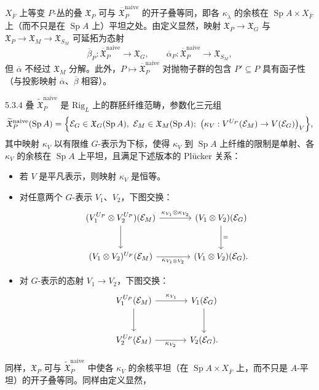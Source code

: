 $X_{\bar F}$ 上等变 $P$-丛的叠 $\mathfrak{X}_P$ 可与 $\overline{\mathfrak{X}}^{\mathrm{naive}}_P$ 的开子叠等同，即各 $\kappa_{\check\lambda}$ 的余核在 $\operatorname{Sp} A\times X_{\bar F}$ 上（而不只是在 $\operatorname{Sp} A$ 上）平坦之处。由定义显然，映射 $\mathfrak{X}_P\to\mathfrak{X}_G$ 与 $\mathfrak{X}_P\to\mathfrak{X}_M\to\mathfrak{X}_{S_M}$ 可延拓为态射
\[
\overline{\beta}_P: \overline{\mathfrak{X}}^{\mathrm{naive}}_P\longrightarrow\mathfrak{X}_G,\qquad
\overline{\alpha}_P: \overline{\mathfrak{X}}^{\mathrm{naive}}_P\longrightarrow\mathfrak{X}_{S_M},
\]
但 $\overline{\alpha}$ 不经过 $\mathfrak{X}_M$ 分解。此外，$P\mapsto\overline{\mathfrak{X}}^{\mathrm{naive}}_P$ 对抛物子群的包含 $P'\subseteq P$ 具有函子性（与投影映射 $\overline{\alpha}$、$\overline{\beta}$ 相容）。

\begin{defn}{5.3.4}
叠 $\widetilde{\mathfrak{X}}^{\mathrm{naive}}_P$ 是 $\mathrm{Rig}_L$ 上的群胚纤维范畴，参数化三元组
\[
\widetilde{\mathfrak{X}}^{\mathrm{naive}}_P(\operatorname{Sp} A)=\Bigl\{\mathcal{E}_G\in\mathfrak{X}_G(\operatorname{Sp} A),\ \mathcal{E}_M\in\mathfrak{X}_M(\operatorname{Sp} A);\ \bigl(\kappa_V: V^{U_P}(\mathcal{E}_M)\to V(\mathcal{E}_G)\bigr)_V\Bigr\},
\]
其中映射 $\kappa_V$ 以有限维 $G$-表示为下标，使得 $\kappa_V$ 到 $\operatorname{Sp} A$ 上纤维的限制是单射、各 $\kappa_V$ 的余核在 $\operatorname{Sp} A$ 上平坦，且满足下述版本的 Plücker 关系：
\begin{itemize}[leftmargin=2.2em,itemsep=0.3em]
\item 若 $V$ 是平凡表示，则映射 $\kappa_V$ 是恒等。
\item 对任意两个 $G$-表示 $V_1$、$V_2$，下图交换：
\[
\begin{tikzcd}[column sep=large,row sep=large]
(V_1^{U_P}\otimes V_2^{U_P})(\mathcal{E}_M) \arrow[r,"\kappa_{V_1}\otimes\kappa_{V_2}"] \arrow[d] & (V_1\otimes V_2)(\mathcal{E}_G) \arrow[d,"="]\\
(V_1\otimes V_2)^{U_P}(\mathcal{E}_M) \arrow[r,"\kappa_{V_1\otimes V_2}"'] & (V_1\otimes V_2)(\mathcal{E}_G).
\end{tikzcd}
\]
\item 对 $G$-表示的态射 $V_1\to V_2$，下图交换：
\[
\begin{tikzcd}[column sep=large,row sep=large]
V_1^{U_P}(\mathcal{E}_M) \arrow[r,"\kappa_{V_1}"] \arrow[d] & V_1(\mathcal{E}_G) \arrow[d]\\
V_2^{U_P}(\mathcal{E}_M) \arrow[r,"\kappa_{V_2}"'] & V_2(\mathcal{E}_G).
\end{tikzcd}
\]
\end{itemize}
\label{thm:a4-5-3-4}
\end{defn}

同样，$\mathfrak{X}_P$ 可与 $\widetilde{\mathfrak{X}}^{\mathrm{naive}}_P$ 中使各 $\kappa_V$ 的余核平坦（在 $\operatorname{Sp} A\times X_{\bar F}$ 上，而不只是 $A$-平坦）的开子叠等同。同样由定义显然，
